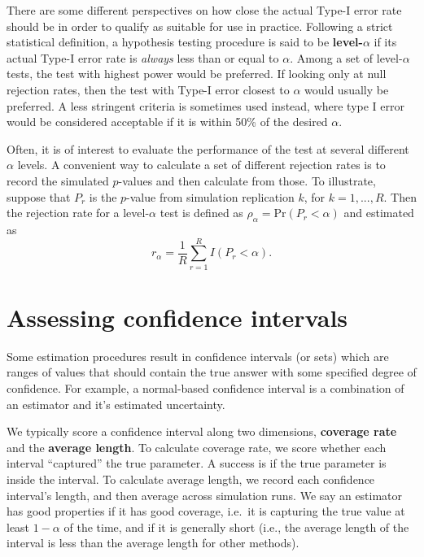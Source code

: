 \documentclass[
]{book}
\begin{document}
There are some different perspectives on how close the actual Type-I error rate should be in order to qualify as suitable for use in practice. Following a strict statistical definition, a hypothesis testing procedure is said to be \textbf{level-\(\alpha\)} if its actual Type-I error rate is \emph{always} less than or equal to \(\alpha\).
Among a set of level-\(\alpha\) tests, the test with highest power would be preferred.
If looking only at null rejection rates, then the test with Type-I error closest to \(\alpha\) would usually be preferred.
A less stringent criteria is sometimes used instead, where type I error would be considered acceptable if it is within 50\% of the desired \(\alpha\).

Often, it is of interest to evaluate the performance of the test at several different \(\alpha\) levels.
A convenient way to calculate a set of different rejection rates is to record the simulated \(p\)-values and then calculate from those.
To illustrate, suppose that \(P_r\) is the \(p\)-value from simulation replication \(k\), for \(k = 1,...,R\).
Then the rejection rate for a level-\(\alpha\) test is defined as \(\rho_\alpha = \text{Pr}\left(P_r < \alpha\right)\) and estimated as
\[r_\alpha = \frac{1}{R} \sum_{r=1}^R I(P_r < \alpha).\]

\hypertarget{assessing-confidence-intervals}{%
\section{Assessing confidence intervals}\label{assessing-confidence-intervals}}

Some estimation procedures result in confidence intervals (or sets) which are ranges of values that should contain the true answer with some specified degree of confidence.
For example, a normal-based confidence interval is a combination of an estimator and it's estimated uncertainty.

We typically score a confidence interval along two dimensions, \textbf{coverage rate} and the \textbf{average length}.
To calculate coverage rate, we score whether each interval ``captured'' the true parameter.
A success is if the true parameter is inside the interval.
To calculate average length, we record each confidence interval's length, and then average across simulation runs.
We say an estimator has good properties if it has good coverage, i.e.~it is capturing the true value at least \(1-\alpha\) of the time, and if it is generally short (i.e., the average length of the interval is less than the average length for other methods).
\end{document}
